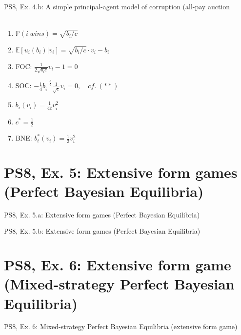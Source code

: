 \begin{frame}{PS8, Ex. 4.b: A simple principal-agent model of corruption (all-pay auction}
\begin{multicols}{2}
\begin{align*}
      \end{align*} \vspace{-16pt}
      \begin{enumerate}
        \item $\mathbb{P}(i\ wins)=\sqrt{b_i/c}$
        \item $\mathbb{E}[u_i(b_i)|v_i]=\sqrt{b_i/c}\cdot v_i-b_i$
        \item FOC: $\frac{1}{2\sqrt{b_ic}}v_i-1=0$
        \item[] SOC: $-\frac{1}{4}b_i^{-\frac{3}{2}}\frac{1}{\sqrt{c}}v_i=0,\quad cf.\ (**)$
        \item $b_i(v_i)=\frac{1}{4c}v_i^2$
        \item $c^*=\frac{1}{2}$
        \item BNE: $b_i^*(v_i)=\frac{1}{2}v_i^2$
      \end{enumerate}
      \vfill\null
    \end{multicols}
\end{frame}



\section{PS8, Ex. 5: Extensive form games (Perfect Bayesian Equilibria)}

\begin{frame}{PS8, Ex. 5.a: Extensive form games (Perfect Bayesian Equilibria)}
    \begin{multicols}{2}
      \vfill\null\columnbreak
      \vfill\null
    \end{multicols}
\end{frame}

\begin{frame}{PS8, Ex. 5.b: Extensive form games (Perfect Bayesian Equilibria)}
    \begin{multicols}{2}
      \vfill\null\columnbreak
      \vfill\null
    \end{multicols}
\end{frame}




\section{PS8, Ex. 6: Extensive form game (Mixed-strategy Perfect Bayesian Equilibria)}

\begin{frame}{PS8, Ex. 6: Mixed-strategy Perfect Bayesian Equilibria (extensive form game)}
    \begin{multicols}{2}
      \vfill\null\columnbreak
      \vfill\null
    \end{multicols}
\end{frame}




